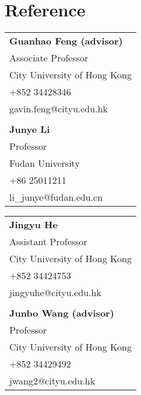 \documentclass{clean_cv}
\begin{document}
\section{Reference}

\hspace{3cm} \begin{tabular}{l}
	
	\textbf{Guanhao Feng (advisor)}                            \\
	Associate Professor                                  \\
	City University of Hong Kong                \\
	+852 34428346                                      \\
	gavin.feng@cityu.edu.hk                       \\
	
	\\
	
	\textbf{Junye Li}                                   \\
	Professor                                                \\
	Fudan University                                   \\
	+86 25011211                                        \\
	li\_junye@fudan.edu.cn                        \\
	
\end{tabular} \hspace{3cm} \begin{tabular}{l}
	
	\textbf{Jingyu He}                                   \\
	Assistant Professor                                \\
	City University of Hong Kong              \\
	+852 34424753                                    \\
	jingyuhe@cityu.edu.hk                         \\
	
	\\
	
	\textbf{Junbo Wang (advisor)}                              \\
	Professor                                                 \\
	City University of Hong Kong                \\
	+852 34429492                                      \\
	jwang2@cityu.edu.hk                            \\
	
\end{tabular} 
\end{document}
